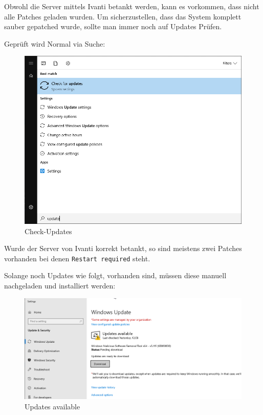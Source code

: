 \begin{flushleft}
    Obwohl die Server mittels \Gls{Ivanti} betankt werden, kann es vorkommen, dass nicht alle Patches geladen wurden.
    Um sicherzustellen, dass das System komplett sauber gepatched wurde, sollte man immer noch auf Updates Prüfen.

    Geprüft wird Normal via Suche:
    \begin{figure}[H]
        \centering
        \includegraphics[width=1\linewidth]{source/general/search_for_updates}
        \caption{Check-Updates}
        \label{fig:check-updates}
    \end{figure}

    \begin{mdframed}
    Wurde der Server von Ivanti korrekt betankt, so sind meistens zwei Patches vorhanden bei denen \texttt{Restart required} steht.
    \end{mdframed}

    Solange noch Updates wie folgt, vorhanden sind, müssen diese manuell nachgeladen und installiert werden:
    \begin{figure}[H]
        \centering
        \includegraphics[width=1\linewidth]{source/general/updates_available}
        \caption{Updates available}
        \label{fig:updates-available}
    \end{figure}


\end{flushleft}
